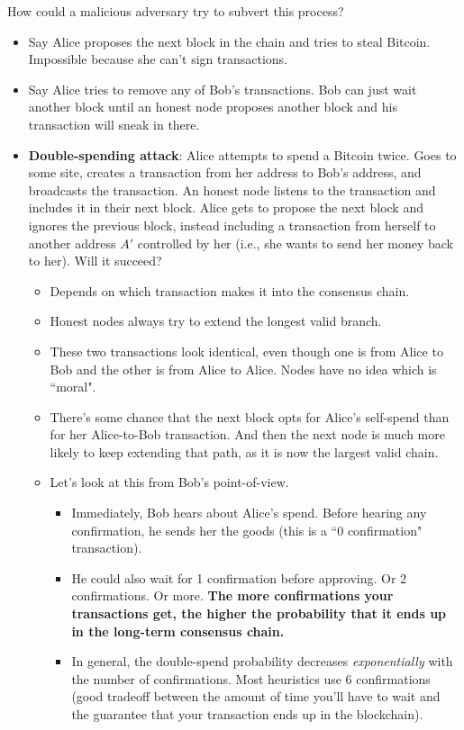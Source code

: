 \documentclass[12pt]{article}
\begin{document}
How could a malicious adversary try to subvert this process?
\begin{itemize}
\item Say Alice proposes the next block in the chain and tries to steal Bitcoin. Impossible because she can't sign transactions.
\item Say Alice tries to remove any of Bob's transactions. Bob can just wait another block until an honest node proposes another block and his transaction will sneak in there.
\item \textbf{Double-spending attack}: Alice attempts to spend a Bitcoin twice. Goes to some site, creates a transaction from her address to Bob's address, and broadcasts the transaction. An honest node listens to the transaction and includes it in their next block. Alice gets to propose the next block and ignores the previous block, instead including a transaction from herself to another address $A'$ controlled by her (i.e., she wants to send her money back to her). Will it succeed?
\begin{itemize}
\item Depends on which transaction makes it into the consensus chain.
\item Honest nodes always try to extend the longest valid branch.
\item These two transactions look identical, even though one is from Alice to Bob and the other is from Alice to Alice. Nodes have no idea which is ``moral".
\item There's some chance that the next block opts for Alice's self-spend than for her Alice-to-Bob transaction. And then the next node is much more likely to keep extending that path, as it is now the largest valid chain.
\item Let's look at this from Bob's point-of-view.
\begin{itemize}
\item Immediately, Bob hears about Alice's spend. Before hearing any confirmation, he sends her the goods (this is a ``0 confirmation" transaction).
\item He could also wait for 1 confirmation before approving. Or 2 confirmations. Or more. \textbf{The more confirmations your transactions get, the higher the probability that it ends up in the long-term consensus chain.}
\item In general, the double-spend probability decreases \textit{exponentially} with the number of confirmations. Most heuristics use 6 confirmations (good tradeoff between the amount of time you'll have to wait and the guarantee that your transaction ends up in the blockchain).
\end{itemize}
\end{itemize}
\end{itemize}
\end{document}

